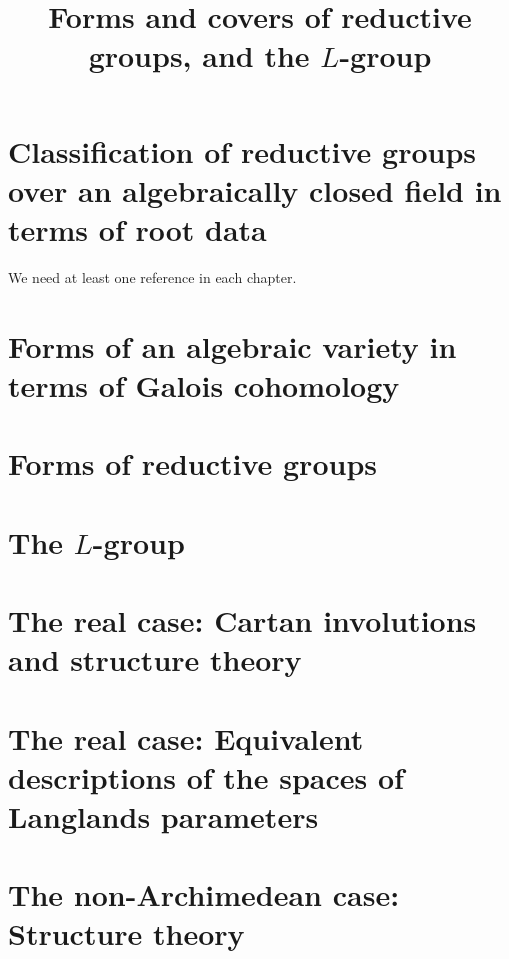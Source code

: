 

%


\title{Forms and covers of reductive groups, and the $L$-group}


\maketitle

\label{section-phantom}

\tableofcontents

\section{Classification of reductive groups over an algebraically closed field in terms of root data}

We need at least one reference \cite{reference} in each chapter.

\section{Forms of an algebraic variety in terms of Galois cohomology}


\section{Forms of reductive groups}


\section{The $L$-group}


\section{The real case: Cartan involutions and structure theory}


\section{The real case: Equivalent descriptions of the spaces of Langlands parameters}


\section{The non-Archimedean case: Structure theory}

















